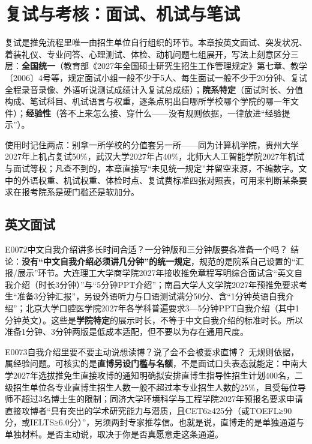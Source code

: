 \chapter{复试与考核：面试、机试与笔试}
\label{ch10}
\begin{keybox}
复试是推免流程里唯一由招生单位自行组织的环节。本章按英文面试、突发状况、着装礼仪、专业问答、心理测试、体检、动机问题七组展开，写法上刻意区分三层：\textbf{全国统一}（教育部《2027年全国硕士研究生招生工作管理规定》第七章、教学〔2006〕4号等，规定面试小组一般不少于5人、每生面试一般不少于20分钟、复试全程录音录像、外语听说测试成绩计入复试总成绩）；\textbf{院系特定}（面试时长、分值构成、笔试科目、机试语言与权重，逐条点明出自哪所学校哪个学院的哪一年文件）；\textbf{经验性}（答不上来怎么接、穿什么——没有规则依据，一律放进“经验提示”）。

使用时记住两点：别拿一所学校的分值套另一所——同为计算机学院，贵州大学2027年上机占复试50\%，武汉大学2027年占40\%，北师大人工智能学院2027年机试与面试等权；凡查不到的，本章直接写“未见统一规定”并留空来源，不编数字。文中的外语权重、机试权重、体检时点、复试费标准四张对照表，可用来判断某条要求在报考院系是硬门槛还是软加分。
\end{keybox}

\section{英文面试}
\begin{qa}{E0072}{中文自我介绍讲多长时间合适？一分钟版和三分钟版要各准备一个吗？}
结论：\textbf{没有“中文自我介绍必须讲几分钟”的统一规定}，规范的是院系自己设置的“汇报/展示”环节。大连理工大学商学院2027年接收推免章程写明综合面试含“英文自我介绍（时长3分钟）”与“5分钟PPT介绍”；南昌大学人文学院2027年预推免要求考生“准备3分钟汇报”，另设外语听力与口语测试满分50分、含“1分钟英语自我介绍”；北京大学口腔医学院2027年各学科普遍要求3—5分钟PPT自我介绍（其中1分钟英文）。这些是\textbf{学院特定}的展示时长，不等于中文自我介绍的标准时长。所以准备1分钟、3分钟两版是低成本适配，但不要以为存在通用尺度。
\end{qa}

\begin{qa}{E0073}{自我介绍里要不要主动说想读博？说了会不会被要求直博？}
无规则依据，属经验问题。可核实的是\textbf{直博另设门槛与名额}，不是面试口头表态就能定：中南大学2027年选拔推免生直接攻博的通知明确拟安排直博生指导性招生计划400名，二级招生单位各专业直博生招生人数一般不超过本专业招生人数的25\%，且受每位导师不超过3名博士生的限制；同济大学环境科学与工程学院2027年预报名要求申请直接攻博者“具有突出的学术研究能力与潜质，且CET6≥425分（或TOEFL≥90分，或IELTS≥6.0分）”，另须两封专家推荐信。也就是说，直博走的是单独通道与单独材料。是否主动说，取决于你是否真愿意走这条通道。
\end{qa}

